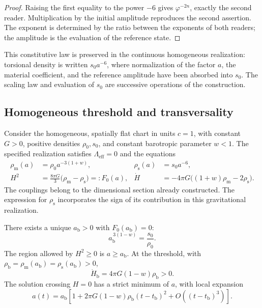 \begin{proof}
Raising the first equality to the power \(-6\) gives
\(\varphi^{-2n}\), exactly the second reader. Multiplication
by the initial amplitude reproduces the second assertion. The exponent
is determined by the ratio between the exponents of both
readers; the amplitude is the evaluation of the reference state.
\end{proof}

This constitutive law is preserved in the continuous homogeneous realization:
torsional density is written \(s_0a^{-6}\), where normalization
of the factor \(a\), the material coefficient, and the reference amplitude
have been absorbed into \(s_0\). The scaling law and evaluation
of \(s_0\) are successive operations of the construction.

\subsection{Homogeneous threshold and transversality}
\label{vii:sec:umbral-rebote}

Consider the homogeneous, spatially flat chart in units \(c=1\),
with constant \(G>0\), positive densities \(\rho_0,s_0\), and constant
barotropic parameter \(w<1\). The specified realization satisfies
\(\Lambda_{\mathrm{eff}}=0\) and the equations
\begin{align}
 \rho_{\mathrm m}(a)&=\rho_0a^{-3(1+w)},&
 \rho_{\mathrm s}(a)&=s_0a^{-6},\\
 H^2&=\frac{8\pi G}{3}
        \bigl(\rho_{\mathrm m}-\rho_{\mathrm s}\bigr)
        =:F_0(a),&
 \dot H&=-4\pi G
        \bigl((1+w)\rho_{\mathrm m}-2\rho_{\mathrm s}\bigr).
 \label{vii:eq:dinamica-homogenea}
\end{align}
The couplings belong to the dimensional section already constructed.
The expression for \(\rho_{\mathrm s}\) incorporates the sign of its contribution
in this gravitational realization.

\begin{theorem}
\label{vii:thm:rebote}
There exists a unique \(a_{\mathrm b}>0\) with \(F_0(a_{\mathrm b})=0\):
\[
 a_{\mathrm b}^{\,3(1-w)}=\frac{s_0}{\rho_0}.
\]
The region allowed by \(H^2\geq0\) is \(a\geq a_{\mathrm b}\).
At the threshold, with
\(\rho_{\mathrm b}=\rho_{\mathrm m}(a_{\mathrm b})
                  =\rho_{\mathrm s}(a_{\mathrm b})>0\),
\[
 \dot H_{\mathrm b}=4\pi G(1-w)\rho_{\mathrm b}>0.
\]
The solution crossing \(H=0\) has a strict minimum of \(a\),
with local expansion
\[
 a(t)=a_{\mathrm b}\left[
 1+2\pi G(1-w)\rho_{\mathrm b}(t-t_{\mathrm b})^2
 +O((t-t_{\mathrm b})^3)\right].
\]
\end{theorem}

